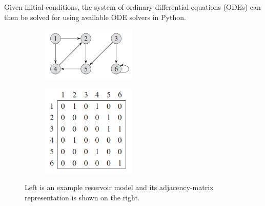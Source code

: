 \noindent Given initial conditions, the system of ordinary differential equations (ODEs) can then be solved for using available ODE solvers in Python.

\begin{figure}[h!]
  \centering
  \begin{subfigure}[b]{0.49\textwidth}
    \includegraphics[width=0.49\textwidth]{Figures/directedGraphDiagram.png}
  \end{subfigure}
  \begin{subfigure}[b]{0.49\textwidth}
    \includegraphics[width=0.49\textwidth]{Figures/adjMatrix.png}
  \end{subfigure}
  \caption{Left is an example reservoir model and its adjacency-matrix representation is shown on the right.} 
  \label{Fig:DG-AdjMatrix}
\end{figure}

